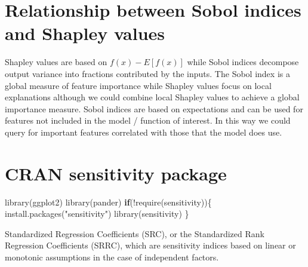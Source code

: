 \documentclass[
  11pt,
]{book}
\newenvironment{Shaded}{\begin{snugshade}}{\end{snugshade}}
\newcommand{\ControlFlowTok}[1]{\textcolor[rgb]{0.13,0.29,0.53}{\textbf{#1}}}
\newcommand{\FunctionTok}[1]{\textcolor[rgb]{0.00,0.00,0.00}{#1}}
\newcommand{\NormalTok}[1]{#1}
\newcommand{\SpecialCharTok}[1]{\textcolor[rgb]{0.00,0.00,0.00}{#1}}
\newcommand{\StringTok}[1]{\textcolor[rgb]{0.31,0.60,0.02}{#1}}
\begin{document}
\hypertarget{relationship-between-sobol-indices-and-shapley-values}{%
\section{Relationship between Sobol indices and Shapley values}\label{relationship-between-sobol-indices-and-shapley-values}}

Shapley values are based on \(f(x)-E[f(x)]\) while Sobol indices decompose output variance into fractions contributed by the inputs. The Sobol index is a global measure of feature importance while Shapley values focus on local explanations although we could combine local Shapley values to achieve a global importance measure. Sobol indices are based on expectations and can be used for features not included in the model / function of interest. In this way we could query for important features correlated with those that the model does use.

\hypertarget{cran-sensitivity-package}{%
\section{CRAN sensitivity package}\label{cran-sensitivity-package}}

\begin{Shaded}
\begin{Highlighting}[]
\FunctionTok{library}\NormalTok{(ggplot2)}
\FunctionTok{library}\NormalTok{(pander)}
\ControlFlowTok{if}\NormalTok{(}\SpecialCharTok{!}\FunctionTok{require}\NormalTok{(sensitivity))\{}
    \FunctionTok{install.packages}\NormalTok{(}\StringTok{"sensitivity"}\NormalTok{)}
    \FunctionTok{library}\NormalTok{(sensitivity)}
\NormalTok{\}}
\end{Highlighting}
\end{Shaded}

Standardized Regression Coefficients (SRC), or the Standardized Rank Regression Coefficients (SRRC), which are sensitivity indices based on linear or monotonic assumptions in the case of independent factors.
\end{document}
